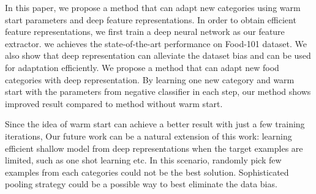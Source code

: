 In this paper, we propose a method that can adapt new categories using warm start parameters and deep feature representations. In order to obtain efficient feature representations, we first train a deep neural network as our feature extractor. we achieves the state-of-the-art performance on Food-101 dataset. We also show that deep representation can alleviate the dataset bias and can be used for adaptation efficiently. We propose a method that can adapt new food categories with deep representation. By learning one new category and warm start with the parameters from negative classifier in each step, our method shows improved result compared to method without warm start.

Since the idea of warm start can achieve a better result with just a few training iterations, Our future work can be a natural extension of this work: learning efficient shallow model from deep representations when the target examples are limited, such as one shot learning etc. In this scenario, randomly pick few examples from each categories could not be the best solution. Sophisticated pooling strategy could be a possible way to best eliminate the data bias.

